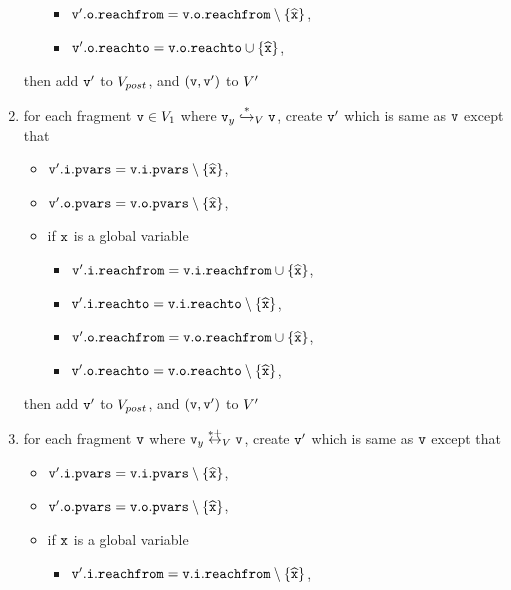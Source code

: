 \begin{enumerate}
\begin{itemize}
\begin{itemize}
\item $\mathtt{v}'.\mathtt{o}.\mathtt{reachfrom} = \mathtt{v}.\mathtt{o}.\mathtt{reachfrom} \setminus \left\{\widehat{\mathtt{x}}\right\}$,
\item $\mathtt{v}'.\mathtt{o}.\mathtt{reachto} = \mathtt{v}.\mathtt{o}.\mathtt{reachto} \cup \left\{\widehat{\mathtt{x}}\right\}$,
\end{itemize}
\end{itemize}
then add $\mathtt{v}'$ to $V_{post}$, and $(\mathtt{v},\mathtt{v}')$ to $V'$
\item for each fragment $\mathtt{v} \in V_1$ where $\mathtt{v}_y \overset{*}\hookrightarrow_{V} \mathtt{v}$, create $\mathtt{v}'$ which is same as $\mathtt{v}$ except that
\begin{itemize}
\item $\mathtt{v}'.\mathtt{i}.\mathtt{pvars} = \mathtt{v}.\mathtt{i}.\mathtt{pvars} \setminus \left\{\widehat{\mathtt{x}}\right\}$,
\item $\mathtt{v}'.\mathtt{o}.\mathtt{pvars} = \mathtt{v}.\mathtt{o}.\mathtt{pvars} \setminus \left\{\widehat{\mathtt{x}}\right\}$,
\item if $\mathtt{x}$ is a global variable
\begin{itemize}
\item $\mathtt{v}'.\mathtt{i}.\mathtt{reachfrom} = \mathtt{v}.\mathtt{i}.\mathtt{reachfrom} \cup \left\{\widehat{\mathtt{x}}\right\}$,
\item $\mathtt{v}'.\mathtt{i}.\mathtt{reachto} = \mathtt{v}.\mathtt{i}.\mathtt{reachto} \setminus \left\{\widehat{\mathtt{x}}\right\}$,
 \item $\mathtt{v}'.\mathtt{o}.\mathtt{reachfrom} = \mathtt{v}.\mathtt{o}.\mathtt{reachfrom} \cup \left\{\widehat{\mathtt{x}}\right\}$,
 \item $\mathtt{v}'.\mathtt{o}.\mathtt{reachto} = \mathtt{v}.\mathtt{o}.\mathtt{reachto} \setminus \left\{\widehat{\mathtt{x}}\right\}$,
\end{itemize}
\end{itemize}
then add $\mathtt{v}'$ to $V_{post}$, and $(\mathtt{v},\mathtt{v}')$ to $V'$
\item for each fragment $\mathtt{v}$ where $\mathtt{v}_y \overset{*+}\leftrightarrow_{V} \mathtt{v}$, create $\mathtt{v}'$ which is same as $\mathtt{v}$ except that
\begin{itemize}
\item $\mathtt{v}'.\mathtt{i}.\mathtt{pvars} = \mathtt{v}.\mathtt{i}.\mathtt{pvars} \setminus \left\{\widehat{\mathtt{x}}\right\}$,
\item $\mathtt{v}'.\mathtt{o}.\mathtt{pvars} = \mathtt{v}.\mathtt{o}.\mathtt{pvars} \setminus \left\{\widehat{\mathtt{x}}\right\}$,
\item if $\mathtt{x}$ is a global variable
\begin{itemize}
\item $\mathtt{v}'.\mathtt{i}.\mathtt{reachfrom} = \mathtt{v}.\mathtt{i}.\mathtt{reachfrom} \setminus \left\{\widehat{\mathtt{x}}\right\}$,

\end{itemize}
\end{itemize}
\end{enumerate}
